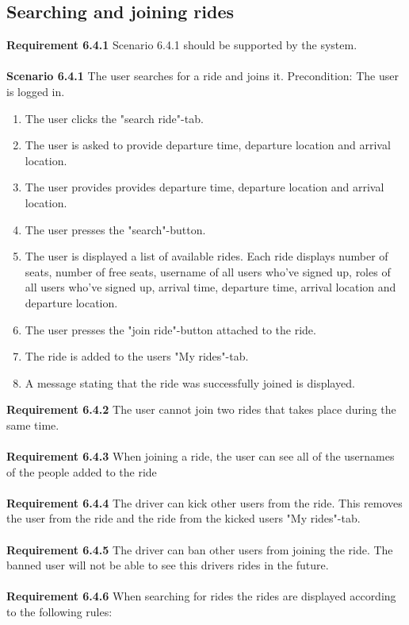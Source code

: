 \documentclass{article}
\begin{document}
\subsection{Searching and joining rides}
\textbf{Requirement 6.4.1} Scenario 6.4.1 should be supported by the system.
\\ \\
\textbf{Scenario 6.4.1} The user searches for a ride and joins it. Precondition: The user is logged in.
\begin{enumerate}
    \item The user clicks the "search ride"-tab.
    \item The user is asked to provide departure time, departure location and arrival location. 
    \item The user provides provides departure time, departure location and arrival location.
    \item The user presses the "search"-button.
    \item The user is displayed a list of available rides. Each ride displays number of seats, number of free seats, username of all users who've signed up, roles of all users who've signed up, arrival time, departure time, arrival location and departure location.  
    \item The user presses the "join ride"-button attached to the ride.
    \item The ride is added to the users "My rides"-tab.
    \item A message stating that the ride was successfully joined is displayed.
\end{enumerate}
\textbf{Requirement 6.4.2} The user cannot join two rides that takes place during the same time.
\\ \\
\textbf{Requirement 6.4.3} When joining a ride, the user can see all of the usernames of the people added to the ride
\\ \\
\textbf{Requirement 6.4.4} The driver can kick other users from the ride. This removes the user from the ride and the ride from the kicked users "My rides"-tab.
\\ \\
\textbf{Requirement 6.4.5} The driver can ban other users from joining the ride. The banned user will not be able to see this drivers rides in the future.
\\ \\
\textbf{Requirement 6.4.6} When searching for rides the rides are displayed according to the following rules:
\end{document}
